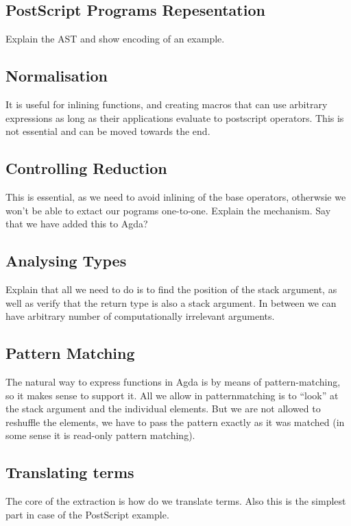 \documentclass[sigplan,anonymous,review]{acmart}
\begin{document}
\subsection{PostScript Programs Repesentation}
Explain the AST and show encoding of an example.

\subsection{\label{sec:normalisation}Normalisation}
It is useful for inlining functions, and creating macros that can use arbitrary expressions
as long as their applications evaluate to postscript operators.
This is not essential and can be moved towards the end.

\subsection{\label{sec:controlling-reduction}Controlling Reduction}
This is essential, as we need to avoid inlining of the base operators, otherwsie
we won't be able to extact our pograms one-to-one.  Explain the mechanism.  Say that we have
added this to Agda?


\subsection{\label{sec:maptypes}Analysing Types}
Explain that all we need to do is to find the position of the stack argument, as well as
verify that the return type is also a stack argument.  In between we can have arbitrary
number of computationally irrelevant arguments.


\subsection{Pattern Matching}
The natural way to express functions in Agda is by means of pattern-matching, so it makes sense
to support it.  All we allow in patternmatching is to ``look'' at the stack argument and the
individual elements.  But we are not allowed to reshuffle the elements, we have to pass the
pattern exactly as it was matched (in some sense it is read-only pattern matching).

\subsection{\label{sec:translating-terms}Translating terms}
The core of the extraction is how do we translate terms.  Also this is the simplest part in
case of the PostScript example.
\end{document}
